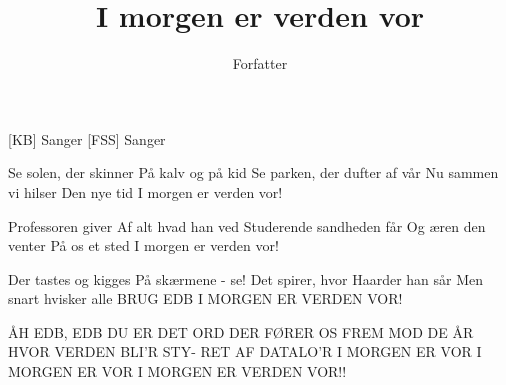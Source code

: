 \documentclass[a4paper,11pt]{article}
\title{I morgen er verden vor}
\author{Forfatter}
\begin{document}
\maketitle

\begin{roles}
[KB] Sanger
[FSS] Sanger
\end{roles}

\begin{song}

 Se solen, der skinner
  På kalv og på kid
  Se parken, der dufter af vår
  Nu sammen vi hilser
  Den nye tid
  I morgen er verden vor!

 Professoren giver
  Af alt hvad han ved
  Studerende sandheden får
  Og æren den venter
  På os et sted
  I morgen er verden vor!

 Der tastes og kigges
  På skærmene - se!
  Det spirer, hvor Haarder han sår
  Men snart hvisker alle
  BRUG EDB
  I MORGEN ER VERDEN VOR!

 ÅH EDB, EDB
  DU ER DET ORD
  DER FØRER OS FREM MOD DE ÅR
  HVOR VERDEN BLI'R STY-
  RET AF DATALO'R
  I MORGEN ER VOR
  I MORGEN ER VOR
  I MORGEN ER VERDEN VOR!!

\end{song}
\end{document}
